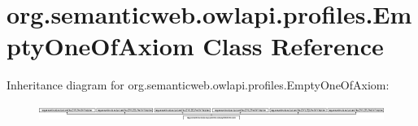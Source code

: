 \hypertarget{classorg_1_1semanticweb_1_1owlapi_1_1profiles_1_1_empty_one_of_axiom}{\section{org.\-semanticweb.\-owlapi.\-profiles.\-Empty\-One\-Of\-Axiom Class Reference}
\label{classorg_1_1semanticweb_1_1owlapi_1_1profiles_1_1_empty_one_of_axiom}
}
Inheritance diagram for org.\-semanticweb.\-owlapi.\-profiles.\-Empty\-One\-Of\-Axiom\-:\begin{figure}[H]
\begin{center}
\leavevmode
\includegraphics[height=0.544218cm]{classorg_1_1semanticweb_1_1owlapi_1_1profiles_1_1_empty_one_of_axiom}
\end{center}
\end{figure}

